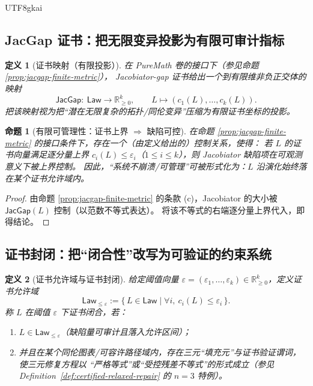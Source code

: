 \documentclass[12pt]{article}
\newtheorem{definition}{定义}[section]
\newtheorem{proposition}{命题}[section]
\newcommand{\JacGap}{\ensuremath{\mathsf{JacGap}}}
\begin{document}
\begin{CJK*}{UTF8}{gkai}
\subsection{JacGap 证书：把无限变异投影为有限可审计指标}

\begin{definition}[证书映射（有限投影）]
\label{def:jacgap-certificate-map}
在 PureMath 卷的接口下（参见命题 \ref{prop:jacgap-finite-metric}），
Jacobiator-gap 证书给出一个到有限维非负正交体的映射
\[
  \JacGap:\ \mathsf{Law}\longrightarrow \mathbb{R}_{\ge 0}^k,
  \qquad
  L\longmapsto (c_1(L),\dots,c_k(L)).
\]
把该映射视为把“潜在无限复杂的拓扑/同伦变异”压缩为\emph{有限证书坐标}的投影。
\end{definition}

\begin{proposition}[有限可管理性：证书上界 $\Rightarrow$ 缺陷可控]
\label{prop:jacgap-implies-controlled-jac}
在命题 \ref{prop:jacgap-finite-metric} 的接口条件下，存在一个（由定义给出的）控制关系，使得：
若 $L$ 的证书向量满足逐分量上界 $c_i(L)\le \varepsilon_i$（$1\le i\le k$），则 Jacobiator 缺陷项在可观测意义下被上界控制。
因此，“系统不崩溃/可管理”可被形式化为：$L$ 沿演化始终落在某个证书允许域内。
\end{proposition}

\begin{proof}
由命题 \ref{prop:jacgap-finite-metric} 的条款 (c)，Jacobiator 的大小被 $\JacGap(L)$ 控制（以范数不等式表达）。
将该不等式的右端逐分量上界代入，即得结论。
\end{proof}

\subsection{证书封闭：把“闭合性”改写为可验证的约束系统}

\begin{definition}[证书允许域与证书封闭]
\label{def:certificate-closure}
给定阈值向量 $\varepsilon=(\varepsilon_1,\dots,\varepsilon_k)\in \mathbb{R}_{\ge 0}^k$，定义证书允许域
\[
  \mathsf{Law}_{\le \varepsilon}
  :=
  \{\,L\in\mathsf{Law}\mid \forall i,\ c_i(L)\le \varepsilon_i\,\}.
\]
称 $L$ 在阈值 $\varepsilon$ 下\emph{证书闭合}，若：
\begin{enumerate}
  \item $L\in \mathsf{Law}_{\le \varepsilon}$（缺陷量可审计且落入允许区间）；
  \item 并且在某个同伦图表/可容许路径域内，存在三元“填充元”与证书验证谓词，使三元修复方程以
        “严格等式”或“受控残差不等式”的形式成立（参见 Definition~\ref{def:certified-relaxed-repair} 的 $n=3$ 特例）。
\end{enumerate}
\end{definition}


\end{CJK*}
\end{document}
